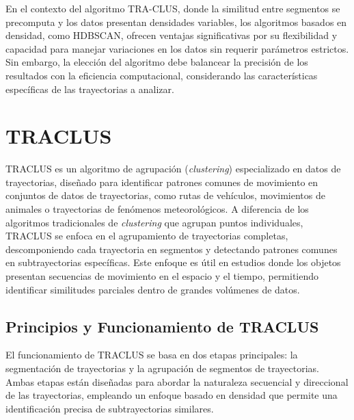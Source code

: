 En el contexto del algoritmo TRA-CLUS, donde la similitud entre segmentos se precomputa y los datos presentan densidades variables, los algoritmos basados en densidad, como HDBSCAN, ofrecen ventajas significativas por su flexibilidad y capacidad para manejar variaciones en los datos sin requerir parámetros estrictos. Sin embargo, la elección del algoritmo debe balancear la precisión de los resultados con la eficiencia computacional, considerando las características específicas de las trayectorias a analizar.


\section{TRACLUS}

TRACLUS \cite{lee2007trajectory} es un algoritmo de agrupación (\textit{clustering}) especializado en datos de trayectorias, diseñado para identificar patrones comunes de movimiento en conjuntos de datos de trayectorias, como rutas de vehículos, movimientos de animales o trayectorias de fenómenos meteorológicos. A diferencia de los algoritmos tradicionales de \textit{clustering} que agrupan puntos individuales, TRACLUS se enfoca en el agrupamiento de trayectorias completas, descomponiendo cada trayectoria en segmentos y detectando patrones comunes en subtrayectorias específicas. Este enfoque es útil en estudios donde los objetos presentan secuencias de movimiento en el espacio y el tiempo, permitiendo identificar similitudes parciales dentro de grandes volúmenes de datos.

\subsection*{Principios y Funcionamiento de TRACLUS}

El funcionamiento de TRACLUS se basa en dos etapas principales: la segmentación de trayectorias y la agrupación de segmentos de trayectorias. Ambas etapas están diseñadas para abordar la naturaleza secuencial y direccional de las trayectorias, empleando un enfoque basado en densidad que permite una identificación precisa de subtrayectorias similares.


